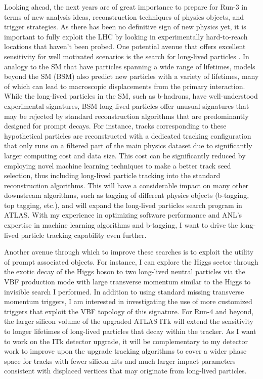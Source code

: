\documentclass[a4paper]{article}
\begin{document}
Looking ahead, the next years are of great importance to prepare for Run-3 in terms of new analysis ideas, reconstruction techniques of physics objects, and trigger strategies. As there has been no definitive sign of new physics yet,
it is important to fully exploit the LHC by looking in experimentally hard-to-reach locations that haven't been probed.
One potential avenue that offers excellent sensitivity for well motivated scenarios is the search for long-lived particles
\cite{alimena2019searching}.
In analogy to the SM that have particles spanning a wide range of lifetimes, models beyond the SM (BSM) also predict new particles
with a variety of lifetimes, many of which can lead to macroscopic displacements from the primary interaction.
While the long-lived particles in the SM, such as b-hadrons, have well-understood experimental signatures, BSM long-lived particles
offer unusual signatures that may be rejected by standard reconstruction algorithms that are predominantly designed for prompt decays.
For instance, tracks corresponding to these hypothetical particles are reconstructed with a dedicated tracking configuration that only runs
on a filtered part of the main physics dataset due to significantly larger computing cost and data size. This cost can be significantly reduced
by employing novel machine learning techniques to make a better track seed selection, thus including long-lived particle tracking
into the standard reconstruction algorithms. This will have a considerable impact on many other downstream algorithms, such as tagging of different
physics objects (b-tagging, top tagging, etc.), and will expand the long-lived particles search program in ATLAS.
With my experience in optimizing software performance and ANL's expertise in machine learning algorithms and b-tagging,
I want to drive the long-lived particle tracking capability even further.

Another avenue through which to improve these searches is to exploit the utility of prompt associated objects.
For instance, I can explore the Higgs sector through the exotic decay of the Higgs boson to two long-lived neutral particles via the VBF production mode with large transverse momentum similar to the Higgs to invisible search I performed. In addition to using standard missing transverse momentum triggers, I am interested in investigating the use of more customized triggers that exploit the VBF topology of this signature.
For Run-4 and beyond, the larger silicon volume of the upgraded ATLAS ITk will extend the sensitivity to longer lifetimes of long-lived particles that decay within the tracker\cite{HLLHC_vertex}.
As I want to work on the ITk detector upgrade, it will be complementary to my detector work to improve upon the upgrade tracking algorithms to cover a wider phase space for tracks with fewer silicon hits and much larger impact parameters consistent with displaced vertices that may originate from long-lived particles.
\end{document}
